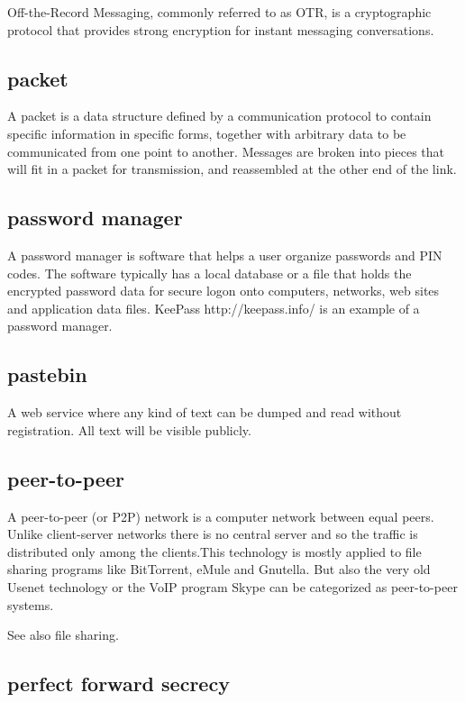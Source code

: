 Off-the-Record Messaging, commonly referred to as OTR, is a
cryptographic protocol that provides strong encryption for instant
messaging conversations.

\subsection{packet}

A packet is a data structure defined by a communication protocol to
contain specific information in specific forms, together with arbitrary
data to be communicated from one point to another. Messages are broken
into pieces that will fit in a packet for transmission, and reassembled
at the other end of the link.

\subsection{password manager}

A password manager is software that helps a user organize passwords and
PIN codes. The software typically has a local database or a file that
holds the encrypted password data for secure logon onto computers,
networks, web sites and application data files. KeePass
http://keepass.info/ is an example of a password manager.

\subsection{pastebin}

A web service where any kind of text can be dumped and read without
registration. All text will be visible publicly.

\subsection{peer-to-peer}

A peer-to-peer (or P2P) network is a computer network between equal
peers. Unlike client-server networks there is no central server and so
the traffic is distributed only among the clients.This technology is
mostly applied to file sharing programs like BitTorrent, eMule and
Gnutella. But also the very old Usenet technology or the VoIP program
Skype can be categorized as peer-to-peer systems.

See also file sharing.

\subsection{perfect forward secrecy}

